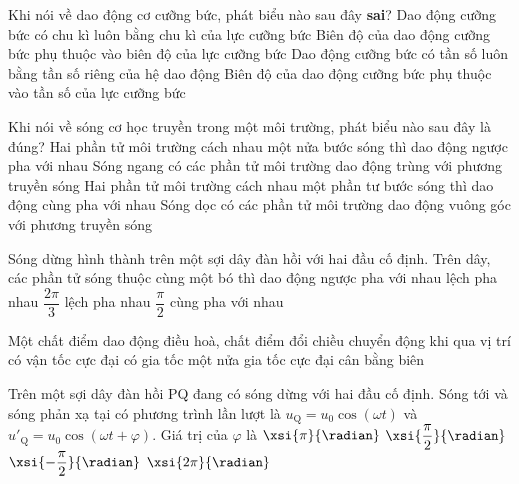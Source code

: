 \begin{ex}
Khi nói về dao động cơ cưỡng bức, phát biểu nào sau đây \textbf{sai}? 
	\choice
	{Dao động cưỡng bức có chu kì luôn bằng chu kì của lực cưỡng bức }
	{Biên độ của dao động cưỡng bức phụ thuộc vào biên độ của lực cưỡng bức}
	{\True Dao động cưỡng bức có tần số luôn bằng tần số riêng của hệ dao động}
	{Biên độ của dao động cưỡng bức phụ thuộc vào tần số của lực cưỡng bức}
	\loigiai{}
\end{ex}
\begin{ex}
Khi nói về sóng cơ học truyền trong một môi trường, phát biểu nào sau đây là đúng? 
	\choice
	{\True Hai phần tử môi trường cách nhau một nửa bước sóng thì dao động ngược pha với nhau}
	{Sóng ngang có các phần tử môi trường dao động trùng với phương truyền sóng}
	{Hai phần tử môi trường cách nhau một phần tư bước sóng thì dao động cùng pha với nhau}
	{Sóng dọc có các phần tử môi trường dao động vuông góc với phương truyền sóng}
	\loigiai{}
\end{ex}
\begin{ex}
	Sóng dừng hình thành trên một sợi dây đàn hồi với hai đầu cố định. Trên dây, các phần tử sóng thuộc cùng một bó thì dao động 
	\choice
	{ngược pha với nhau}
	{lệch pha nhau $\dfrac{2\pi}{3}$}
	{lệch pha nhau $\dfrac{\pi}{2}$}
	{\True cùng pha với nhau}
	\loigiai{}
\end{ex}
\begin{ex}
Một chất điểm dao động điều hoà, chất điểm đổi chiều chuyển động khi qua vị trí
	\choice
	{có vận tốc cực đại}
	{có gia tốc một nửa gia tốc cực đại}
	{cân bằng}
	{\True biên}
	\loigiai{}
\end{ex}
\begin{ex}
Trên một sợi dây đàn hồi PQ đang có sóng dừng với hai đầu cố định. Sóng tới và sóng phản xạ tại có phương trình lần lượt là $u_{\mathrm{Q}}=u_0\cos\left(\omega t\right)$  và $u'_{\mathrm{Q}}=u_0\cos\left(\omega t+\varphi\right)$. Giá trị của $\varphi$  là 
	\choice
	{\True $\xsi{\pi}{\radian}$}
	{$\xsi{\dfrac{\pi}{2}}{\radian}$}
	{$\xsi{-\dfrac{\pi}{2}}{\radian}$}
	{$\xsi{2\pi}{\radian}$}
	\loigiai{}
\end{ex}
